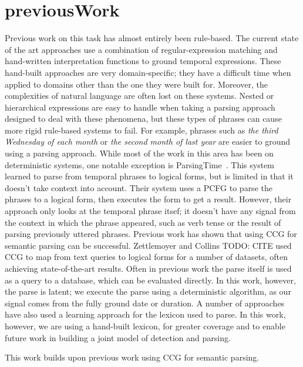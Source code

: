 \section{previousWork}
\label{sec:previousWork}
Previous work on this task has almost entirely been rule-based. The current state of the art approaches use a combination of regular-expression matching and hand-written interpretation functions to ground temporal expressions. These hand-built approaches are very domain-specific; they have a difficult time when applied to domains other than the one they were built for. Moreover, the complexities of natural language are often lost on these systems. Nested or hierarchical expressions are easy to handle when taking a parsing approach designed to deal with these phenomena, but these types of phrases can cause more rigid rule-based systems to fail. For example, phrases such as \emph{the third Wednesday of each month} or \emph{the second month of last year} are easier to ground using a parsing approach. 
While most of the work in this area has been on deterministic systems, one notable exception is ParsingTime~\cite{ParsingTime}. This system learned to parse from temporal phrases to logical forms, but is limited in that it doesn't take context into account. Their system uses a PCFG to parse the phrases to a logical form, then executes the form to get a result. However, their approach only looks at the temporal phrase itsef; it doesn't have any signal from the context in which the phrase appeared, such as verb tense or the result of parsing previously uttered phrases.
Previous work has shown that using CCG for semantic parsing can be successful. Zettlemoyer and Collins TODO: CITE used CCG to map from text queries to logical forms for a number of datasets, often achieving state-of-the-art results. Often in previous work the parse itself is used as a query to a database, which can be evaluated directly. In this work, however, the parse is latent; we execute the parse using a deterministic algorithm, as our signal comes from the fully ground date or duration. A number of approaches have also used a learning approach for the lexicon used to parse. In this work, however, we are using a hand-built lexicon, for greater coverage and to enable future work in building a joint model of detection and parsing.

This work builds upon previous work using CCG for semantic parsing. 
